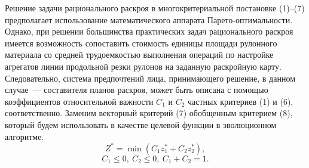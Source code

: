 \documentclass[12pt]{article}
\begin{document}
Решение задачи рационального раскроя в многокритериальной постановке (1)--(7) 
предполагает использование математического аппарата Парето-оптимальности. 
Однако, при решении большинства практических задач рационального раскроя 
имеется возможность сопоставить стоимость единицы площади рулонного материала 
со средней трудоемкостью выполнения операций по настройке агрегатов линии 
продольной резки рулонов на заданную раскройную карту. Следовательно, система 
предпочтений лица, принимающего решение, в данном случае~--- составителя планов 
раскроя, может быть описана с помощью коэффициентов относительной важности 
$C_1$ и $C_2$ частных критериев (1) и (6), соответственно. Заменим векторный 
критерий (7) обобщенным критерием (8), который будем использовать в качестве 
целевой функции в эволюционном алгоритме.
\begin{equation}
    Z^*=\min{(C_1z_1^*+C_2z_2^*)},
\end{equation}
\[C_1 \leq 0, \: C_2 \leq 0, \: C_1+C_2=1.\]
\end{document}
